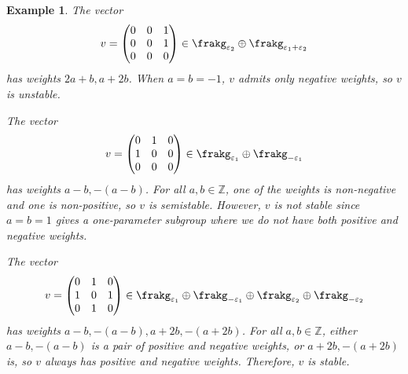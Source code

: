 \documentclass[12pt]{amsart}
\theoremstyle{plain}
\newtheorem{example}[theorem]{Example}
\begin{document}
\begin{example}
The vector 
$$v = \begin{pmatrix} 0 & 0 & 1 \\ 0 & 0 & 1 \\ 0 & 0 & 0 \end{pmatrix} \in \frakg_{\varepsilon_2} \oplus \frakg_{\varepsilon_1 + \varepsilon_2}$$
has weights $2a + b, a + 2b$.
When $a = b = -1$, $v$ admits only negative weights, so $v$ is unstable.

The vector 
$$v = \begin{pmatrix} 0 & 1 & 0 \\ 1 & 0 & 0 \\ 0 & 0 & 0 \end{pmatrix} \in \frakg_{\varepsilon_1} \oplus \frakg_{-\varepsilon_1}$$
has weights $a-b, - (a-b)$.
For all $a, b \in \mathbb{Z}$, one of the weights is non-negative and one is non-positive, so $v$ is semistable.
However, $v$ is not stable since $a=b=1$ gives a one-parameter subgroup where we do not have both positive and negative weights.

The vector 
$$v = \begin{pmatrix} 0 & 1 & 0 \\ 1 & 0 & 1 \\ 0 & 1 & 0 \end{pmatrix} \in  \frakg_{\varepsilon_1} \oplus \frakg_{-\varepsilon_1} \oplus  \frakg_{\varepsilon_2} \oplus \frakg_{-\varepsilon_2}$$
has weights $a-b, -(a-b), a+2b, -(a+2b)$.
For all $a, b \in \mathbb{Z}$, either $a-b, -(a-b)$ is a pair of positive and negative weights, or $a+2b, -(a+2b)$ is, so $v$ always has positive and negative weights.
Therefore, $v$ is stable.
\end{example}
\end{document}
